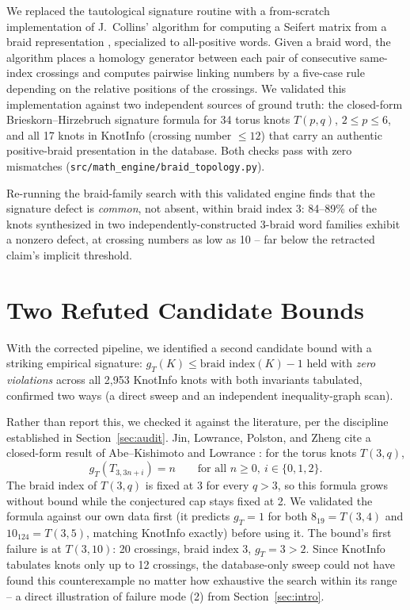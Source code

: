 \documentclass[11pt]{article}
\theoremstyle{definition}
\begin{document}
We replaced the tautological signature routine with a from-scratch implementation of J.~Collins' algorithm for computing a Seifert matrix from a braid representation \cite{collins2007}, specialized to all-positive words. Given a braid word, the algorithm places a homology generator between each pair of consecutive same-index crossings and computes pairwise linking numbers by a five-case rule depending on the relative positions of the crossings. We validated this implementation against two independent sources of ground truth: the closed-form Brieskorn--Hirzebruch signature formula for 34 torus knots $T(p,q)$, $2 \leq p \leq 6$, and all 17 knots in KnotInfo (crossing number $\leq 12$) that carry an authentic positive-braid presentation in the database. Both checks pass with zero mismatches (\texttt{src/math\_engine/braid\_topology.py}).

Re-running the braid-family search with this validated engine finds that the signature defect is \emph{common}, not absent, within braid index 3: 84--89\% of the knots synthesized in two independently-constructed 3-braid word families exhibit a nonzero defect, at crossing numbers as low as 10 -- far below the retracted claim's implicit threshold.

\section{Two Refuted Candidate Bounds}
\label{sec:refuted}

With the corrected pipeline, we identified a second candidate bound with a striking empirical signature: $g_T(K) \leq \text{braid index}(K) - 1$ held with \emph{zero violations} across all 2{,}953 KnotInfo knots with both invariants tabulated, confirmed two ways (a direct sweep and an independent inequality-graph scan).

Rather than report this, we checked it against the literature, per the discipline established in Section~\ref{sec:audit}. Jin, Lowrance, Polston, and Zheng \cite{jlpz2017} cite a closed-form result of Abe--Kishimoto \cite{abekishimoto2010} and Lowrance \cite{lowrance2011}: for the torus knots $T(3,q)$,
\[
g_T(T_{3,3n+i}) = n \qquad \text{for all } n \geq 0,\ i \in \{0,1,2\}.
\]
The braid index of $T(3,q)$ is fixed at 3 for every $q > 3$, so this formula grows without bound while the conjectured cap stays fixed at 2. We validated the formula against our own data first (it predicts $g_T = 1$ for both $8_{19} = T(3,4)$ and $10_{124} = T(3,5)$, matching KnotInfo exactly) before using it. The bound's first failure is at $T(3,10)$: 20 crossings, braid index 3, $g_T = 3 > 2$. Since KnotInfo tabulates knots only up to 12 crossings, the database-only sweep could not have found this counterexample no matter how exhaustive the search within its range -- a direct illustration of failure mode (2) from Section~\ref{sec:intro}.
\end{document}

